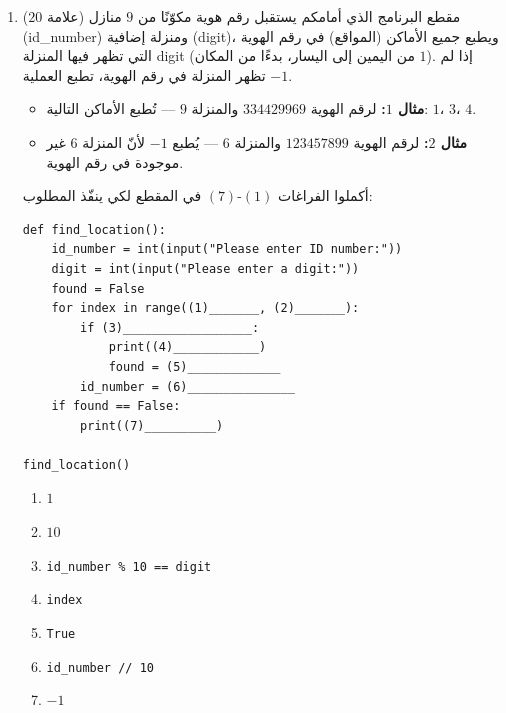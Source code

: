 \documentclass[14pt]{extarticle}
\begin{document}
\begin{enumerate}[resume, label=\textbf{السؤال \arabic*:}, wide=0pt, itemsep=2.2em]
\begin{enumerate}[label=\alph*.]
\ifwithsols
\begin{boxSolution}
\begin{enumerate}[label=(\arabic*)]
\item $0$
\item \textenglish{\texttt{num \% x == 0}}
\item $x$
\item $x + 1$
\item \textenglish{\texttt{sum == num}}
\end{enumerate}
\end{boxSolution}
\fi
\filbreak
\end{enumerate}
\filbreak

\item ($20$ علامة) مقطع البرنامج الذي أمامكم يستقبل رقم هوية مكوّنًا من $9$ منازل (\textenglish{id\_number}) ومنزلة إضافية (\textenglish{digit})، ويطبع جميع الأماكن (المواقع) في رقم الهوية التي تظهر فيها المنزلة \textenglish{digit} (من اليمين إلى اليسار، بدءًا من المكان $1$).
إذا لم تظهر المنزلة في رقم الهوية، تطبع العملية $-1$.
\begin{itemize}
\item \textbf{مثال $1$:} لرقم الهوية $334429969$ والمنزلة $9$ — تُطبع الأماكن التالية: $1$، $3$، $4$.
\item \textbf{مثال $2$:} لرقم الهوية $123457899$ والمنزلة $6$ — يُطبع $-1$ لأنّ المنزلة $6$ غير موجودة في رقم الهوية.
\end{itemize}
أكملوا الفراغات $(1)$-$(7)$ في المقطع لكي ينفّذ المطلوب:

\begin{boxCode}
\begin{english}
\begin{verbatim}
def find_location():
    id_number = int(input("Please enter ID number:"))
    digit = int(input("Please enter a digit:"))
    found = False
    for index in range((1)_______, (2)_______):
        if (3)__________________:
            print((4)____________)
            found = (5)_____________
        id_number = (6)_______________
    if found == False:
        print((7)__________)

find_location()
\end{verbatim}
\end{english}
\end{boxCode}

\ifwithsols
\begin{boxSolution}
\begin{enumerate}[label=(\arabic*)]
\item $1$
\item $10$
\item \textenglish{\texttt{id\_number \% 10 == digit}}
\item \textenglish{\texttt{index}}
\item \textenglish{\texttt{True}}
\item \textenglish{\texttt{id\_number // 10}}
\item $-1$
\end{enumerate}
\end{boxSolution}
\fi
\filbreak


\end{enumerate}
\end{document}
